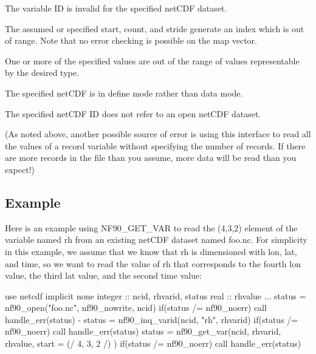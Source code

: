 \begin{DoxyItemize}
\item The variable ID is invalid for the specified net\+C\+DF dataset.
\item The assumed or specified start, count, and stride generate an index which is out of range. Note that no error checking is possible on the map vector.
\item One or more of the specified values are out of the range of values representable by the desired type.
\item The specified net\+C\+DF is in define mode rather than data mode.
\item The specified net\+C\+DF ID does not refer to an open net\+C\+DF dataset.
\end{DoxyItemize}

(As noted above, another possible source of error is using this interface to read all the values of a record variable without specifying the number of records. If there are more records in the file than you assume, more data will be read than you expect!)

\subsection*{Example}

Here is an example using N\+F90\+\_\+\+G\+E\+T\+\_\+\+V\+AR to read the (4,3,2) element of the variable named rh from an existing net\+C\+DF dataset named foo.\+nc. For simplicity in this example, we assume that we know that rh is dimensioned with lon, lat, and time, so we want to read the value of rh that corresponds to the fourth lon value, the third lat value, and the second time value\+:


\begin{DoxyCode}
\textcolor{keywordtype}{use }netcdf
\textcolor{keywordtype}{implicit none}
\textcolor{keywordtype}{integer} :: ncid, rhvarid, status
\textcolor{keywordtype}{real}    :: rhvalue
...
status = nf90\_open(\textcolor{stringliteral}{"foo.nc"}, nf90\_nowrite, ncid)
\textcolor{keywordflow}{if}(status /= nf90\_noerr) \textcolor{keyword}{call }handle\_err(status)
-
status = nf90\_inq\_varid(ncid, \textcolor{stringliteral}{"rh"}, rhvarid)
\textcolor{keywordflow}{if}(status /= nf90\_noerr) \textcolor{keyword}{call }handle\_err(status)
status = nf90\_get\_var(ncid, rhvarid, rhvalue, start = (/ 4, 3, 2 /) )
\textcolor{keywordflow}{if}(status /= nf90\_noerr) \textcolor{keyword}{call }handle\_err(status)
\end{DoxyCode}


